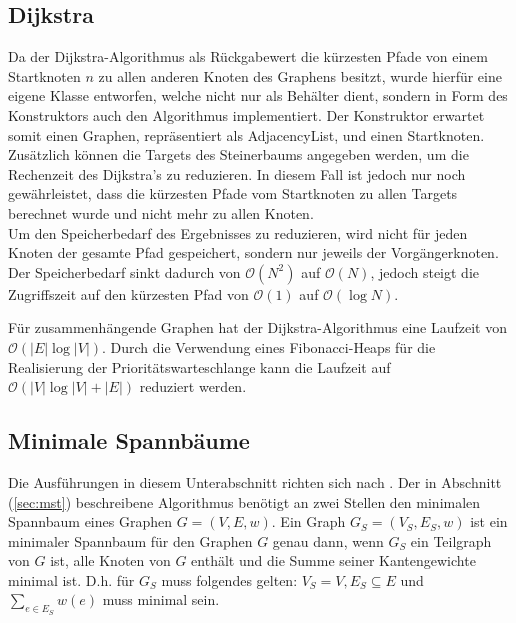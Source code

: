 \documentclass[a4paper,10pt]{article}
\begin{document}
\subsection{Dijkstra}
Da der Dijkstra-Algorithmus als Rückgabewert die kürzesten Pfade von einem Startknoten $n$ zu allen anderen Knoten des Graphens besitzt,
wurde hierfür eine eigene Klasse entworfen, welche nicht nur als Behälter dient, sondern in Form des Konstruktors auch den Algorithmus implementiert.
Der Konstruktor erwartet somit einen Graphen, repräsentiert als AdjacencyList, und einen Startknoten. Zusätzlich können die Targets des Steinerbaums
angegeben werden, um die Rechenzeit des Dijkstra's zu reduzieren. In diesem Fall ist jedoch nur noch gewährleistet, dass die kürzesten Pfade vom Startknoten
zu allen Targets berechnet wurde und nicht mehr zu allen Knoten.\\
Um den Speicherbedarf des Ergebnisses zu reduzieren, wird nicht für jeden Knoten der gesamte Pfad gespeichert, sondern nur jeweils der Vorgängerknoten.
Der Speicherbedarf sinkt dadurch von $\mathcal{O}(N^2)$ auf $\mathcal{O}(N)$, jedoch steigt die Zugriffszeit auf den kürzesten Pfad von $\mathcal{O}(1)$ auf $\mathcal{O}(\log{}N)$.

Für zusammenhängende Graphen hat der Dijkstra-Algorithmus eine Laufzeit von $\mathcal{O}(|E|\log|V|)$. Durch die Verwendung eines Fibonacci-Heaps
für die Realisierung der Prioritätswarteschlange kann die Laufzeit auf $\mathcal{O}(|V|\log|V| + |E|)$ reduziert werden.



\subsection{Minimale Spannbäume}
Die Ausführungen in diesem Unterabschnitt richten sich nach \cite[Kapitel 23]{cormen}.
Der in Abschnitt (\ref{sec:mst}) beschreibene Algorithmus benötigt an zwei Stellen den minimalen Spannbaum eines Graphen $G=(V,E,w)$. Ein Graph
$G_S=(V_S,E_S,w)$ ist ein minimaler Spannbaum für den Graphen $G$ genau dann, wenn $G_S$ ein Teilgraph von $G$ ist, alle Knoten von $G$ enthält und die Summe seiner Kantengewichte minimal ist. D.h. für $G_S$ muss folgendes gelten: $V_S=V, E_S \subseteq E$ und $\sum_{e \in E_S} w(e)$ muss minimal sein.
\smallskip
\end{document}
